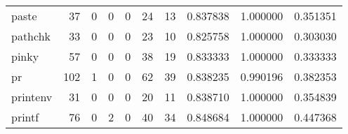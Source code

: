 \begin{longtable}{lrrrrrrrrr}
paste     &                                        37 &                                                  0 &                                                  0 &                                                  0 &                                                 24 &                                                 13 &                                           0.837838 &                               1.000000 &                             0.351351 \\
pathchk   &                                        33 &                                                  0 &                                                  0 &                                                  0 &                                                 23 &                                                 10 &                                           0.825758 &                               1.000000 &                             0.303030 \\
pinky     &                                        57 &                                                  0 &                                                  0 &                                                  0 &                                                 38 &                                                 19 &                                           0.833333 &                               1.000000 &                             0.333333 \\
pr        &                                       102 &                                                  1 &                                                  0 &                                                  0 &                                                 62 &                                                 39 &                                           0.838235 &                               0.990196 &                             0.382353 \\
printenv  &                                        31 &                                                  0 &                                                  0 &                                                  0 &                                                 20 &                                                 11 &                                           0.838710 &                               1.000000 &                             0.354839 \\
printf    &                                        76 &                                                  0 &                                                  2 &                                                  0 &                                                 40 &                                                 34 &                                           0.848684 &                               1.000000 &                             0.447368 \\

\end{longtable}
